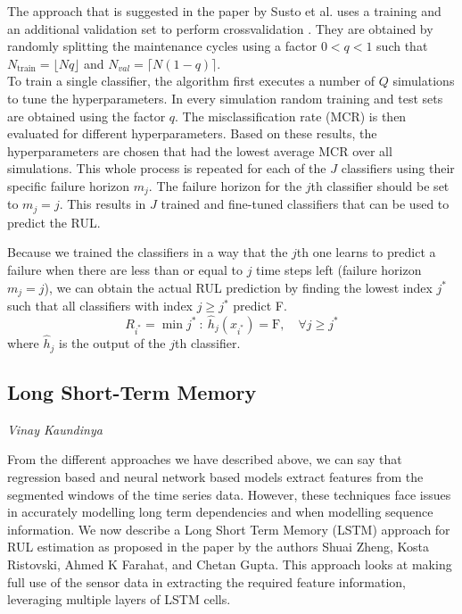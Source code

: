The approach that is suggested in the paper by Susto et al. uses a training and an additional validation set to perform crossvalidation \cite{DBLP:journals/tii/SustoSPMB15}. They are obtained by randomly splitting the maintenance cycles using a factor $0 < q < 1$ such that $N_\text{train} = \lfloor Nq\rfloor$ and $N_{val} = \lceil N(1-q)\rceil$.\\
To train a single classifier, the algorithm first executes a number of $Q$ simulations to tune the hyperparameters. In every simulation random training and test sets are obtained using the factor $q$. The misclassification rate (MCR) is then evaluated for different hyperparameters. Based on these results, the hyperparameters are chosen that had the lowest average MCR over all simulations. This whole process is repeated for each of the $J$ classifiers using their specific failure horizon $m_j$. The failure horizon for the $j$th classifier should be set to $m_j = j$. This results in $J$ trained and fine-tuned classifiers that can be used to predict the RUL.

Because we trained the classifiers in a way that the $j$th one learns to predict a failure when there are less than or equal to $j$ time steps left (failure horizon $m_j = j$), we can obtain the actual RUL prediction by finding the lowest index $j^*$ such that all classifiers with index $j \geq j^*$ predict F.
\begin{equation}
    R_{i^*} = \min j^* \::\: \hat{h}_j(x_{i^*}) = \text{F},\quad \forall j \geq j^*
\end{equation}
where $\hat{h}_j$ is the output of the $j$th classifier.

\subsection{Long Short-Term Memory}
\vspace*{-12.5mm}\hfill{\normalsize\emph{Vinay Kaundinya}}
\label{sec:rul_estimation:approaches:lstm_rul}

From the different approaches we have described above, we can say that regression based and neural network based models extract features from the segmented windows of the time series data. However, these techniques face issues in accurately modelling long term dependencies and when modelling sequence information. We now describe a Long Short Term Memory (LSTM) approach for RUL estimation as proposed in the paper \cite{DBLP:conf/icphm/ZhengRFG17} by the authors Shuai Zheng, Kosta Ristovski, Ahmed K Farahat, and Chetan Gupta. This approach looks at making full use of the sensor data in extracting the required feature information, leveraging multiple layers of LSTM cells.

